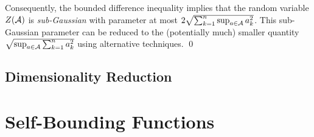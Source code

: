 \documentclass[11pt]{article}
\begin{document}
\begin{itemize}
\begin{example}
Consequently, the bounded difference inequality implies that the random variable $Z({\mathcal A})$ is \emph{sub-Gaussian} with parameter at most $2 \sqrt{\sum_{k=1}^{n}\sup_{a \in {\mathcal A}}a_k^2}$. This sub-Gaussian parameter can be reduced to the (potentially much) smaller quantity $\sqrt{\sup_{a \in {\mathcal A}}\sum_{k=1}^{n}a_k^2}$ using alternative techniques. \qed
\end{example}
\end{itemize}
\subsection{Dimensionality Reduction}

\section{Self-Bounding Functions}
\end{document}
